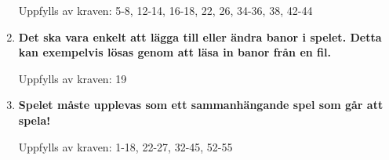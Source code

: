 \documentclass{TDP005mall}
\begin{document}
\begin{enumerate}
    Uppfylls av kraven: 5-8, 12-14, 16-18, 22, 26, 34-36, 38, 42-44
    
    \item \textbf{ Det ska vara enkelt att lägga till eller ändra banor i spelet. Detta kan exempelvis lösas genom att läsa in banor från en fil.}
    
    Uppfylls av kraven: 19
    
    \item \textbf{Spelet måste upplevas som ett sammanhängande spel som går att spela!}
    
    Uppfylls av kraven: 1-18, 22-27, 32-45, 52-55

\end{enumerate}
\end{document}
